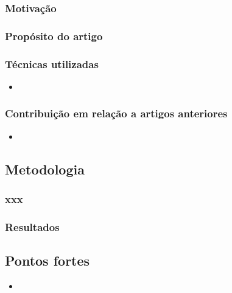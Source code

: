 \subsubsection{Motivação}

\subsubsection{Propósito do artigo}

\subsubsection{Técnicas utilizadas} 
\begin{itemize}
  \item 
\end{itemize}  

\subsubsection{Contribuição em relação a artigos anteriores} %
 \begin{itemize}
   \item 
 \end{itemize}  

\subsection{Metodologia}

\subsubsection{xxx}

\subsubsection{Resultados}

\subsection{Pontos fortes} %
\begin{itemize}
  \item
\end{itemize}  

